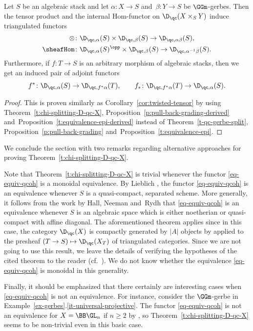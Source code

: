 \begin{corollary}
\label{cor:twisted-tensor-derived}
Let $S$ be an algebraic stack and let $\alpha\colon X \to S$ and~$\beta\colon Y \to S$ be $\GGm$-gerbes.
Then the tensor product and the internal Hom-functor on $\D_\qc(X\times_S Y)$ induce triangulated functors
\begin{align*}
\otimes & \colon \D_{\qc, \alpha}(S) \times \D_{\qc, \beta}(S)
\to \D_{\qc, \alpha\beta}(S),\\
\sheafHom & \colon \D_{\qc, \alpha}(S)^\opp \times \D_{\qc, \beta}(S)
\to \D_{\qc, \alpha^{-1}\beta}(S).
\end{align*}
Furthermore, if $f\colon T \to S$ is an arbitrary morphism of algebraic stacks,
then we get an induced pair of adjoint functors
\begin{equation*}
  f^* \colon \D_{\qc, \alpha}(S) \to \D_{\qc, f^*\alpha}(T),
  \qquad
  f_* \colon \D_{\qc, f^*\alpha}(T) \to \D_{\qc, \alpha}(S).
\end{equation*}
\end{corollary}
\begin{proof}
This is proven similarly as Corollary~\ref{cor:twisted-tensor} by using 
Theorem~\ref{t:chi-splitting-D-qc-X},
Proposition~\ref{p:pull-back-grading-derived}
and~Proposition~\ref{t:equivalence-epi-derived}
instead of
Theorem~\ref{t-qc-gerbe-split},
Proposition~\ref{p:pull-back-grading}
and~Proposition~\ref{t:equivalence-epi}.
\end{proof}

We conclude the section with two remarks regarding alternative
approaches for proving Theorem~\ref{t:chi-splitting-D-qc-X}.
\begin{remark}
\label{rem-trivial-case}
Note that Theorem~\ref{t:chi-splitting-D-qc-X} is trivial whenever the functor \eqref{eq-equiv-qcoh}
is a monoidal equivalence.
By Lieblich \cite[Proposition~2.2.4.6]{lieblich2004},
the functor \eqref{eq-equiv-qcoh} is an equivalence whenever $S$ is a quasi-compact,
separated scheme.
More generally, it follows from the work by Hall, Neeman and~Rydh \cite[Theorem~1.2]{hnr2018}
that \eqref{eq-equiv-qcoh} is an equivalence whenever
$S$ is an algebraic space which is either noetherian or quasi-compact with affine diagonal.
The aforementioned theorem applies since in this case,
the category $\D_\qc(X)$ is compactly generated by $|A|$ objects by
\cite[Theorem~6.9]{hr2017} 
applied to the presheaf
$
(T \to S) \mapsto \D_\qc(X_T)
$
of triangulated categories.
Since we are not going to use this result,
we leave the details of verifying the hypotheses of the
cited theorem to
the reader (cf.~\cite[Example~9.2]{hr2017}).
We do not know whether the equivalence \eqref{eq-equiv-qcoh} is monoidal in this generality.

Finally, it should be emphasized that there certainly are interesting cases when
\eqref{eq-equiv-qcoh} is not an equivalence. 
For instance, consider the $\GGm$-gerbe in Example~\ref{ex-gerbes}.\ref{it-universal-projective}.
The functor \eqref{eq-equiv-qcoh} is not an
equivalence for $X = \BB\GL_n$ if $n \geq 2$
by \cite[Theorem~1.3]{hnr2018},
so Theorem~\ref{t:chi-splitting-D-qc-X} seems to be non-trivial even in this basic case.
\end{remark}


